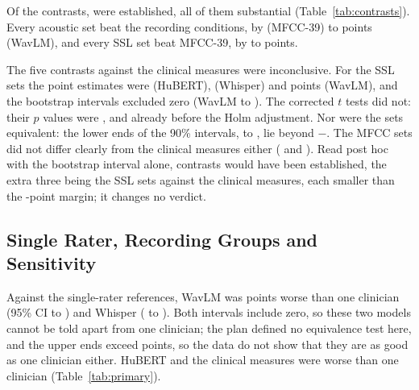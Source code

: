 \documentclass[journal]{IEEEtran}
\begin{document}
Of the \cTotal{} contrasts, \cEstablished{} were established, all of them substantial (Table~\ref{tab:contrasts}). Every acoustic set beat the recording conditions, by \cAtwoMzeroDelta{} (MFCC-39) to \cAfiveMzeroDelta{} points (WavLM), and every SSL set beat MFCC-39, by \cAfourAtwoDelta{} to \cAfiveAtwoDelta{} points.

The five contrasts against the clinical measures were inconclusive. For the SSL sets the point estimates were \cAfourAthreeDelta{} (HuBERT), \cAsixAthreeDelta{} (Whisper) and \cAfiveAthreeDelta{} points (WavLM), and the bootstrap intervals excluded zero (WavLM \cAfiveAthreeLow{} to \cAfiveAthreeHigh{}). The corrected $t$ tests did not: their $p$ values were \cAfourAthreePRaw{}, \cAsixAthreePRaw{} and \cAfiveAthreePRaw{} already before the Holm adjustment. Nor were the sets equivalent: the lower ends of the 90\% intervals, \cAfourAthreeEqLow{} to \cAfiveAthreeEqLow{}, lie beyond $-$\margin{}. The MFCC sets did not differ clearly from the clinical measures either (\cAoneAthreeDelta{} and \cAtwoAthreeDelta{}). Read post hoc with the bootstrap interval alone, \cCiOnly{} contrasts would have been established, the extra three being the SSL sets against the clinical measures, each smaller than the \margin{}-point margin; it changes no verdict.

\begin{table}[!t]
\centering
\caption{The \cTotal{} Confirmatory Contrasts ($\Delta$ = RMSE of the First Set Minus the Second, CAPE-V Points). Holm $p$ Is From the Corrected Resampled $t$ Test. ``CI Only'' Is the Verdict if the Bootstrap Interval Alone Were Used, a Post Hoc Reading Outside the Frozen Rule}
\label{tab:contrasts}

\end{table}

\subsection{Single Rater, Recording Groups and Sensitivity}
Against the single-rater references, WavLM was \esixAfiveDelta{} points worse than one clinician (95\% CI \esixAfiveLow{} to \esixAfiveHigh{}) and Whisper \esixAsixDelta{} (\esixAsixLow{} to \esixAsixHigh{}). Both intervals include zero, so these two models cannot be told apart from one clinician; the plan defined no equivalence test here, and the upper ends exceed \margin{} points, so the data do not show that they are as good as one clinician either. HuBERT and the clinical measures were worse than one clinician (Table~\ref{tab:primary}).
\end{document}
